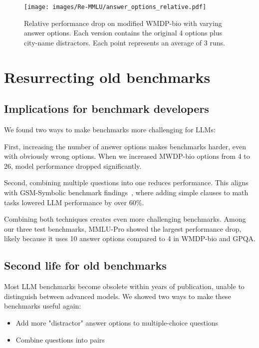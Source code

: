 \documentclass{article}
\begin{document}
\begin{figure}[H]
    \centering
    \texttt{[image: images/Re-MMLU/answer\_options\_relative.pdf]}
    \caption{Relative performance drop on modified WMDP-bio with varying answer options. Each version contains the original 4 options plus city-name distractors. Each point represents an average of 3 runs.}
    \label{fig:different numbers of answer options}
\end{figure}

\section{Resurrecting old benchmarks}

\subsection{Implications for benchmark developers}

We found two ways to make benchmarks more challenging for LLMs:

First, increasing the number of answer options makes benchmarks harder, even with obviously wrong options. When we increased MWDP-bio options from 4 to 26, model performance dropped significantly.

Second, combining multiple questions into one reduces performance. This aligns with GSM-Symbolic benchmark findings~\cite{gsmsymbolic}, where adding simple clauses to math tasks lowered LLM performance by over 60\%.

Combining both techniques creates even more challenging benchmarks. Among our three test benchmarks, MMLU-Pro showed the largest performance drop, likely because it uses 10 answer options compared to 4 in WMDP-bio and GPQA.

\subsection{Second life for old benchmarks}
Most LLM benchmarks become obsolete within years of publication, unable to distinguish between advanced models. We showed two ways to make these benchmarks useful again:

\begin{itemize}[noitemsep]
    \item Add more "distractor" answer options to multiple-choice questions
    \item Combine questions into pairs
\end{itemize}
\end{document}
